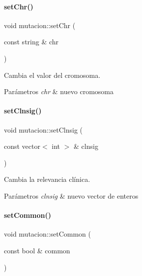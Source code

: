 \paragraph{\texorpdfstring{set\+Chr()}{setChr()}}
{\footnotesize\ttfamily void mutacion\+::set\+Chr (\begin{DoxyParamCaption}\item[{const string \&}]{chr }\end{DoxyParamCaption})}



Cambia el valor del cromosoma. 


\begin{DoxyParams}{Parámetros}
{\em chr} & nuevo cromosoma \\
\hline
\end{DoxyParams}
\hypertarget{classmutacion_ad69eed035c3c25f23bc587d9e6f99c05}{}\label{classmutacion_ad69eed035c3c25f23bc587d9e6f99c05} 
\paragraph{\texorpdfstring{set\+Clnsig()}{setClnsig()}}
{\footnotesize\ttfamily void mutacion\+::set\+Clnsig (\begin{DoxyParamCaption}\item[{const vector$<$ int $>$ \&}]{clnsig }\end{DoxyParamCaption})}



Cambia la relevancia clínica. 


\begin{DoxyParams}{Parámetros}
{\em clnsig} & nuevo vector de enteros \\
\hline
\end{DoxyParams}
\hypertarget{classmutacion_ab62d36e9bad78d43ace74fdaec909ca6}{}\label{classmutacion_ab62d36e9bad78d43ace74fdaec909ca6} 
\paragraph{\texorpdfstring{set\+Common()}{setCommon()}}
{\footnotesize\ttfamily void mutacion\+::set\+Common (\begin{DoxyParamCaption}\item[{const bool \&}]{common }\end{DoxyParamCaption})}



